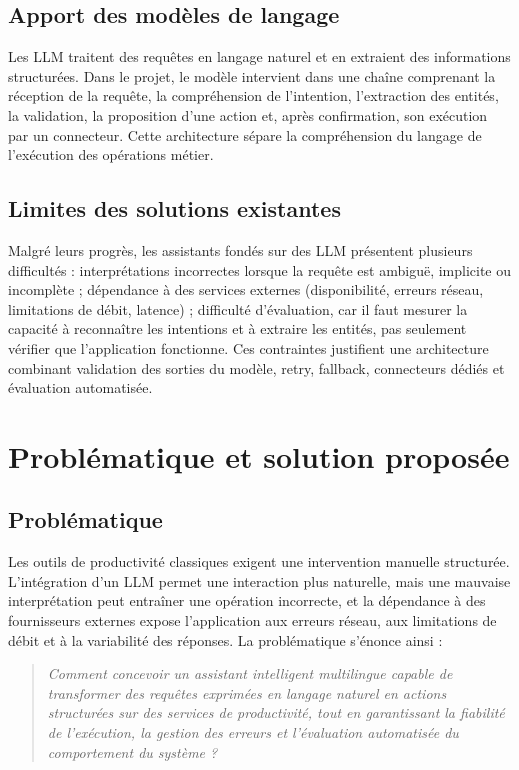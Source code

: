 \documentclass[11pt,a4paper,openany,oneside]{report}
\begin{document}
\subsection{Apport des modèles de langage}
Les LLM traitent des requêtes en langage naturel et en extraient des informations structurées. Dans le projet, le modèle intervient dans une chaîne comprenant la réception de la requête, la compréhension de l'intention, l'extraction des entités, la validation, la proposition d'une action et, après confirmation, son exécution par un connecteur. Cette architecture sépare la compréhension du langage de l'exécution des opérations métier.

\subsection{Limites des solutions existantes}
Malgré leurs progrès, les assistants fondés sur des LLM présentent plusieurs difficultés : interprétations incorrectes lorsque la requête est ambiguë, implicite ou incomplète ; dépendance à des services externes (disponibilité, erreurs réseau, limitations de débit, latence) ; difficulté d'évaluation, car il faut mesurer la capacité à reconnaître les intentions et à extraire les entités, pas seulement vérifier que l'application fonctionne. Ces contraintes justifient une architecture combinant validation des sorties du modèle, retry, fallback, connecteurs dédiés et évaluation automatisée.

\section{Problématique et solution proposée}
\subsection{Problématique}
Les outils de productivité classiques exigent une intervention manuelle structurée. L'intégration d'un LLM permet une interaction plus naturelle, mais une mauvaise interprétation peut entraîner une opération incorrecte, et la dépendance à des fournisseurs externes expose l'application aux erreurs réseau, aux limitations de débit et à la variabilité des réponses. La problématique s'énonce ainsi :

\begin{quote}\itshape
Comment concevoir un assistant intelligent multilingue capable de transformer des requêtes exprimées en langage naturel en actions structurées sur des services de productivité, tout en garantissant la fiabilité de l'exécution, la gestion des erreurs et l'évaluation automatisée du comportement du système ?
\end{quote}
\end{document}
